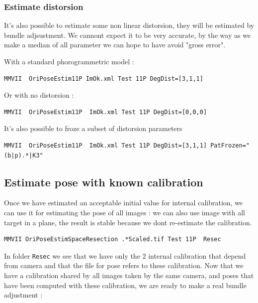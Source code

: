 
\subsubsection{Estimate distorsion}

It's also possible to estimate some non linear distorsion, they will be
estimated by bundle adjsustment. We cannont expect it to be  very accurate,
by the way as we make a median of all parameter we can hope to have 
avoid "gross  error".

With a standard phorogrammetric model :

\begin{lstlisting}
MMVII  OriPoseEstim11P ImOk.xml Test 11P DegDist=[3,1,1]
\end{lstlisting}

Or with no distorsion :

\begin{lstlisting}
MMVII  OriPoseEstim11P  ImOk.xml Test 11P DegDist=[0,0,0]
\end{lstlisting}

It's also possible to froze a subset of distorsion parameters 

\begin{lstlisting}
MMVII  OriPoseEstim11P  ImOk.xml Test 11P DegDist=[3,1,1] PatFrozen="(b|p).*|K3"
\end{lstlisting}


\subsection{Estimate pose with known calibration}

Once we have estimated an acceptable initial value for internal 
calibration, we can use it for estimating the pose of all images :
we can also use image with all target in a plane, the result is stable
because we dont re-estimate the calibration.

\begin{lstlisting}
MMVII OriPoseEstimSpaceResection .*Scaled.tif Test 11P  Resec
\end{lstlisting}

In folder {\tt Resec} we see that we have only the $2$ internal calibration
that depend from camera and that the file for pose refers to these calibration.
Now that we have a calibration shared by all images taken by the same camera, and 
poses that have been computed with these calibration, we are ready to make
a real bundle adjustment :



